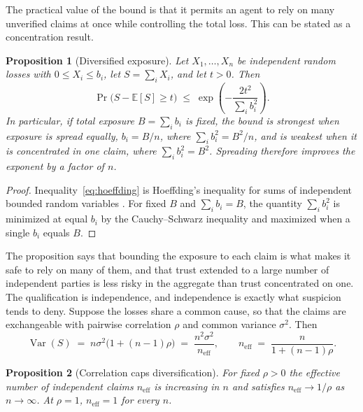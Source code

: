 \documentclass[11pt]{article}
\newtheorem{proposition}{Proposition}
\theoremstyle{definition}
\begin{document}
The practical value of the bound is that it permits an agent to rely on many unverified claims at once while controlling the total loss. This can be stated as a concentration result.

\begin{proposition}[Diversified exposure]
Let $X_1,\dots,X_n$ be independent random losses with $0\le X_i\le b_i$, let $S=\sum_i X_i$, and let $t>0$. Then
\begin{equation}
\Pr\bigl(S-\mathbb E[S]\ge t\bigr)\;\le\;\exp\!\left(-\frac{2t^{2}}{\sum_i b_i^{2}}\right).
\label{eq:hoeffding}
\end{equation}
In particular, if total exposure $B=\sum_i b_i$ is fixed, the bound is strongest when exposure is spread equally, $b_i=B/n$, where $\sum_i b_i^2=B^2/n$, and is weakest when it is concentrated in one claim, where $\sum_i b_i^2=B^2$. Spreading therefore improves the exponent by a factor of $n$.
\end{proposition}

\begin{proof}
Inequality~\eqref{eq:hoeffding} is Hoeffding's inequality for sums of independent bounded random variables \cite{hoeffding1963}. For fixed $B$ and $\sum_i b_i=B$, the quantity $\sum_i b_i^2$ is minimized at equal $b_i$ by the Cauchy--Schwarz inequality and maximized when a single $b_i$ equals $B$.
\end{proof}

The proposition says that bounding the exposure to each claim is what makes it safe to rely on many of them, and that trust extended to a large number of independent parties is less risky in the aggregate than trust concentrated on one. The qualification is independence, and independence is exactly what suspicion tends to deny. Suppose the losses share a common cause, so that the claims are exchangeable with pairwise correlation $\rho$ and common variance $\sigma^2$. Then
\begin{equation}
\operatorname{Var}(S)\;=\;n\sigma^{2}\bigl(1+(n-1)\rho\bigr)\;=\;\frac{n^{2}\sigma^{2}}{n_{\mathrm{eff}}},\qquad n_{\mathrm{eff}}\;=\;\frac{n}{1+(n-1)\rho}.
\label{eq:neff}
\end{equation}

\begin{proposition}[Correlation caps diversification]
For fixed $\rho>0$ the effective number of independent claims $n_{\mathrm{eff}}$ is increasing in $n$ and satisfies $n_{\mathrm{eff}}\to 1/\rho$ as $n\to\infty$. At $\rho=1$, $n_{\mathrm{eff}}=1$ for every $n$.
\end{proposition}
\end{document}
